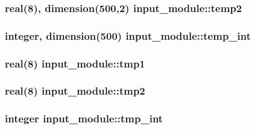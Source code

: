 \subsubsection[{temp2}]{\setlength{\rightskip}{0pt plus 5cm}real(8), dimension(500,2) input\+\_\+module\+::temp2}\label{namespaceinput__module_ac72418d482bc6d9b164dc8ff77f80812}
\hypertarget{namespaceinput__module_a129d3471a7d48a92476195ec540b0599}{}
\subsubsection[{temp\+\_\+int}]{\setlength{\rightskip}{0pt plus 5cm}integer, dimension(500) input\+\_\+module\+::temp\+\_\+int}\label{namespaceinput__module_a129d3471a7d48a92476195ec540b0599}
\hypertarget{namespaceinput__module_a1030c19aa6f6f484e8f538320aa753b0}{}
\subsubsection[{tmp1}]{\setlength{\rightskip}{0pt plus 5cm}real(8) input\+\_\+module\+::tmp1}\label{namespaceinput__module_a1030c19aa6f6f484e8f538320aa753b0}
\hypertarget{namespaceinput__module_a4344e7e8b58aa6d6e534cc25168867dc}{}
\subsubsection[{tmp2}]{\setlength{\rightskip}{0pt plus 5cm}real(8) input\+\_\+module\+::tmp2}\label{namespaceinput__module_a4344e7e8b58aa6d6e534cc25168867dc}
\hypertarget{namespaceinput__module_a98528ea542cc829033364307335ecdf6}{}
\subsubsection[{tmp\+\_\+int}]{\setlength{\rightskip}{0pt plus 5cm}integer input\+\_\+module\+::tmp\+\_\+int}\label{namespaceinput__module_a98528ea542cc829033364307335ecdf6}
\hypertarget{namespaceinput__module_ae5dd4121bdb07e96089cd081a3017dd9}{}
